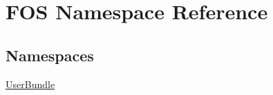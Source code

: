 \hypertarget{namespace_f_o_s}{\section{F\+O\+S Namespace Reference}
\label{namespace_f_o_s}
}
\subsection*{Namespaces}
\begin{DoxyCompactItemize}
\item 
 \hyperlink{namespace_f_o_s_1_1_user_bundle}{User\+Bundle}
\end{DoxyCompactItemize}
